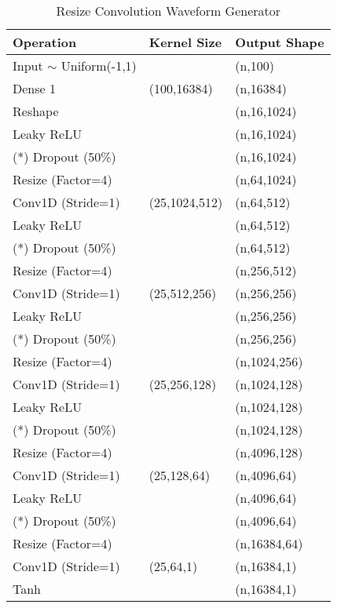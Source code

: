 \begin{table}[h]
\caption{Resize Convolution Waveform Generator}\label{wavegan_gen_resize}
\centering
\begin{tabular}{l|l|l}
Operation & Kernel Size & Output Shape \\ \hline
Input $\sim$ Uniform(-1,1) & \  & (n,100)\\
Dense 1 & (100,16384) & (n,16384)\\
Reshape & \ & (n,16,1024)\\
Leaky ReLU & \ & (n,16,1024)\\
(*) Dropout (50\%) & \ & (n,16,1024)\\
Resize (Factor=4) & \ & (n,64,1024)\\
Conv1D (Stride=1) & (25,1024,512) & (n,64,512)\\
Leaky ReLU & \  & (n,64,512)\\
(*) Dropout (50\%) & \  & (n,64,512)\\
Resize (Factor=4) & \ & (n,256,512)\\
Conv1D (Stride=1) & (25,512,256) & (n,256,256)\\
Leaky ReLU & \  & (n,256,256)\\
(*) Dropout (50\%) & \  & (n,256,256)\\
Resize (Factor=4) & \ & (n,1024,256)\\
Conv1D (Stride=1) & (25,256,128) & (n,1024,128)\\
Leaky ReLU & \  & (n,1024,128)\\
(*) Dropout (50\%) & \  & (n,1024,128)\\
Resize (Factor=4) & \ & (n,4096,128)\\
Conv1D (Stride=1) & (25,128,64) & (n,4096,64)\\
Leaky ReLU & \  & (n,4096,64)\\
(*) Dropout (50\%) & \  & (n,4096,64)\\
Resize (Factor=4) & \ & (n,16384,64)\\
Conv1D (Stride=1) & (25,64,1) & (n,16384,1)\\
Tanh & \  & (n,16384,1)\\
\end{tabular}
\end{table}

